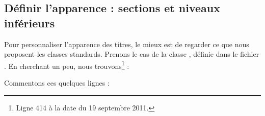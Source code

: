 \subsection{Définir l'apparence : sections et niveaux inférieurs}\label{apparencetitre}

Pour personnaliser l'apparence des titres, le mieux est de regarder ce que nous proposent les classes standards. Prenons le cas de la classe , définie dans le fichier . En cherchant un peu, nous trouvons\footnote{Ligne 414 à la date du 19 septembre 2011.} :

\begin{latexcode}
\newcommand\section{\@startsection {section}{1}{\z@}%
                             {-3.5ex \@plus -1ex \@minus -.2ex}%
                             {2.3ex \@plus.2ex}%
                             {\normalfont\Large\bfseries}}
\end{latexcode}

Commentons ces quelques lignes :

